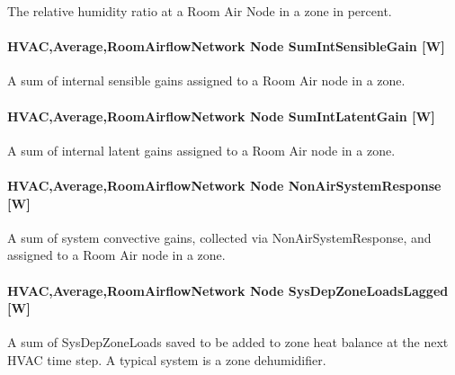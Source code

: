 The relative humidity ratio at a Room Air Node in a zone in percent.

\paragraph{HVAC,Average,RoomAirflowNetwork Node SumIntSensibleGain {[}W{]}}\label{hvacaverageroomairflownetwork-node-sumintsensiblegain-w}

A sum of internal sensible gains assigned to a Room Air node in a zone.

\paragraph{HVAC,Average,RoomAirflowNetwork Node SumIntLatentGain {[}W{]}}\label{hvacaverageroomairflownetwork-node-sumintlatentgain-w}

A sum of internal latent gains assigned to a Room Air node in a zone.

\paragraph{HVAC,Average,RoomAirflowNetwork Node NonAirSystemResponse {[}W{]}}\label{hvacaverageroomairflownetwork-node-nonairsystemresponse-w}

A sum of system convective gains, collected via NonAirSystemResponse, and assigned to a Room Air node in a zone.

\paragraph{HVAC,Average,RoomAirflowNetwork Node SysDepZoneLoadsLagged {[}W{]}}\label{hvacaverageroomairflownetwork-node-sysdepzoneloadslagged-w}

A sum of SysDepZoneLoads saved to be added to zone heat balance at the next HVAC time step. A typical system is a zone dehumidifier.
